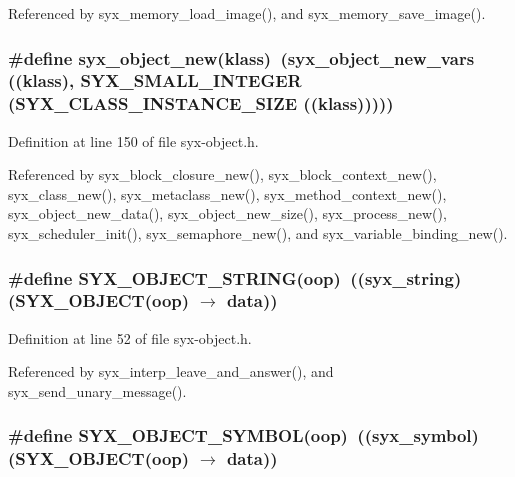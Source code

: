 Referenced by syx\_\-memory\_\-load\_\-image(), and syx\_\-memory\_\-save\_\-image().\hypertarget{syx-object_8h_a3c2d59b7296539517361dea284a0db7}{
\subsubsection{\setlength{\rightskip}{0pt plus 5cm}\#define syx\_\-object\_\-new(klass)~(syx\_\-object\_\-new\_\-vars ((klass), SYX\_\-SMALL\_\-INTEGER (SYX\_\-CLASS\_\-INSTANCE\_\-SIZE ((klass)))))}}
\label{syx-object_8h_a3c2d59b7296539517361dea284a0db7}




Definition at line 150 of file syx-object.h.

Referenced by syx\_\-block\_\-closure\_\-new(), syx\_\-block\_\-context\_\-new(), syx\_\-class\_\-new(), syx\_\-metaclass\_\-new(), syx\_\-method\_\-context\_\-new(), syx\_\-object\_\-new\_\-data(), syx\_\-object\_\-new\_\-size(), syx\_\-process\_\-new(), syx\_\-scheduler\_\-init(), syx\_\-semaphore\_\-new(), and syx\_\-variable\_\-binding\_\-new().\hypertarget{syx-object_8h_d9120176c6ebd87a4075472386e6f748}{
\subsubsection{\setlength{\rightskip}{0pt plus 5cm}\#define SYX\_\-OBJECT\_\-STRING(oop)~(({\bf syx\_\-string})(SYX\_\-OBJECT(oop) $\rightarrow$ data))}}
\label{syx-object_8h_d9120176c6ebd87a4075472386e6f748}




Definition at line 52 of file syx-object.h.

Referenced by syx\_\-interp\_\-leave\_\-and\_\-answer(), and syx\_\-send\_\-unary\_\-message().\hypertarget{syx-object_8h_5b9c62927be3b204756647a1ee461d1d}{
\subsubsection{\setlength{\rightskip}{0pt plus 5cm}\#define SYX\_\-OBJECT\_\-SYMBOL(oop)~(({\bf syx\_\-symbol})(SYX\_\-OBJECT(oop) $\rightarrow$ data))}}
\label{syx-object_8h_5b9c62927be3b204756647a1ee461d1d}




